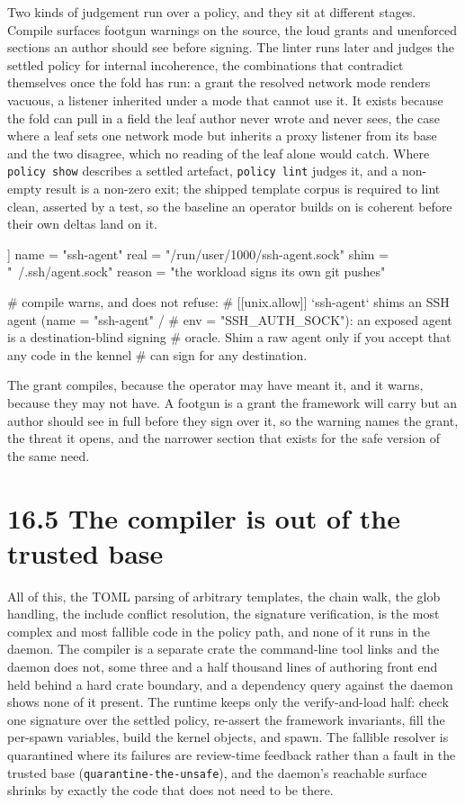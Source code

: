 Two kinds of judgement run over a policy, and they sit at different
stages. Compile surfaces footgun warnings on the source, the loud grants
and unenforced sections an author should see before signing. The linter
runs later and judges the settled policy for internal incoherence, the
combinations that contradict themselves once the fold has run: a grant
the resolved network mode renders vacuous, a listener inherited under a
mode that cannot use it. It exists because the fold can pull in a field
the leaf author never wrote and never sees, the case where a leaf sets
one network mode but inherits a proxy listener from its base and the two
disagree, which no reading of the leaf alone would catch. Where
\texttt{policy\ show} describes a settled artefact,
\texttt{policy\ lint} judges it, and a non-empty result is a non-zero
exit; the shipped template corpus is required to lint clean, asserted by
a test, so the baseline an operator builds on is coherent before their
own deltas land on it.

\begin{kennelcode}
[[unix.allow]]
name = "ssh-agent"
real = "/run/user/1000/ssh-agent.sock"
shim = "~/.ssh/agent.sock"
reason = "the workload signs its own git pushes"

# compile warns, and does not refuse:
# [[unix.allow]] `ssh-agent` shims an SSH agent (name = "ssh-agent" /
# env = "SSH_AUTH_SOCK"): an exposed agent is a destination-blind signing
# oracle. Shim a raw agent only if you accept that any code in the kennel
# can sign for any destination.
\end{kennelcode}

The grant compiles, because the operator may have meant it, and it
warns, because they may not have. A footgun is a grant the framework
will carry but an author should see in full before they sign over it, so
the warning names the grant, the threat it opens, and the narrower
section that exists for the safe version of the same need.

\hypertarget{the-compiler-is-out-of-the-trusted-base}{%
\section{16.5 The compiler is out of the trusted
base}\label{the-compiler-is-out-of-the-trusted-base}}

All of this, the TOML parsing of arbitrary templates, the chain walk,
the glob handling, the include conflict resolution, the signature
verification, is the most complex and most fallible code in the policy
path, and none of it runs in the daemon. The compiler is a separate
crate the command-line tool links and the daemon does not, some three
and a half thousand lines of authoring front end held behind a hard
crate boundary, and a dependency query against the daemon shows none of
it present. The runtime keeps only the verify-and-load half: check one
signature over the settled policy, re-assert the framework invariants,
fill the per-spawn variables, build the kernel objects, and spawn. The
fallible resolver is quarantined where its failures are review-time
feedback rather than a fault in the trusted base
(\texttt{quarantine-the-unsafe}), and the daemon's reachable surface
shrinks by exactly the code that does not need to be there.


